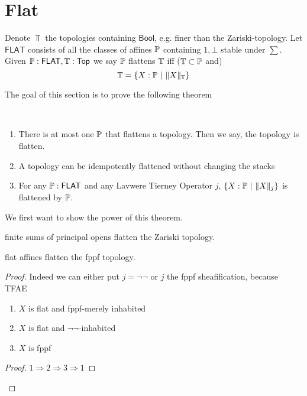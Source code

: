 \section{Flat}


\begin{definition}
	Denote $\Top$ the topologies containing $\mathsf{Bool}$, e.g. finer than the Zariski-topology.
	Let $\mathsf{FLAT}$ consists of all the classes of affines $\mathbb{P}$ containing $1, \bot$ stable under $\sum$. \\
	Given $\mathbb{P}: \mathsf{FLAT} , \mathbb{T}: \operatorname{\mathsf{Top}}$ we say $\mathbb{P}$ flattens $\mathbb{T}$ iff ($\mathbb{T} \subset \mathbb{P}$ and)
	\[
		\mathbb{T}= \{X : \mathbb{P}\ | \ \|X\|_{\mathbb{T}} \}
	\]
\end{definition}
The goal of this section is to prove the following theorem
\begin{theorem}{\label{thm:Flat}}
 \
	\begin{enumerate}
		\item There is at most one $\mathbb{P}$ that flattens a topology. Then we say, the topology is flatten.
		\item A topology can be idempotently flattened without changing the stacks
		\item For any $\mathbb{P}: \mathsf{FLAT}$ and any Lavwere Tierney Operator $j$, $\{ X: \mathbb{P} \ | \ \|X\|_j \}$ is flattened by $\mathbb{P}$.
	\end{enumerate}
\end{theorem}
We first want to show the power of this theorem.
\begin{example}
	finite sums of principal opens flatten the Zariski topology. 
\end{example}
\begin{example}
	flat affines flatten the fppf topology. %
\end{example}
\begin{proof}
	Indeed we can either put $j = \lnot \lnot$ or $j$ the fppf sheafification, because TFAE
	\begin{enumerate}
		\item  $X$ is flat and fppf-merely inhabited
		\item $X$ is flat  and $\lnot\lnot$-inhabited
		\item $X$ is fppf
	\end{enumerate}
	
	\begin{proof}
		$1 \Rightarrow 2 \Rightarrow 3 \Rightarrow 1$ \todocite
	\end{proof}	 
	
\end{proof}

